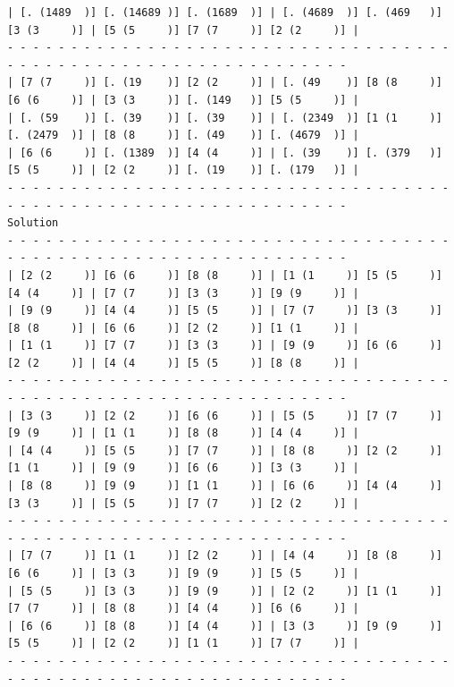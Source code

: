 \documentclass{article}
\begin{document}
\begin{small}
\begin{verbatim}
| [. (1489  )] [. (14689 )] [. (1689  )] | [. (4689  )] [. (469   )] [3 (3     )] | [5 (5     )] [7 (7     )] [2 (2     )] |
- - - - - - - - - - - - - - - - - - - - - - - - - - - - - - - - - - - - - - - - - - - - - - - - - - - - - - - - - - - - - -
| [7 (7     )] [. (19    )] [2 (2     )] | [. (49    )] [8 (8     )] [6 (6     )] | [3 (3     )] [. (149   )] [5 (5     )] |
| [. (59    )] [. (39    )] [. (39    )] | [. (2349  )] [1 (1     )] [. (2479  )] | [8 (8     )] [. (49    )] [. (4679  )] |
| [6 (6     )] [. (1389  )] [4 (4     )] | [. (39    )] [. (379   )] [5 (5     )] | [2 (2     )] [. (19    )] [. (179   )] |
- - - - - - - - - - - - - - - - - - - - - - - - - - - - - - - - - - - - - - - - - - - - - - - - - - - - - - - - - - - - - -
Solution
- - - - - - - - - - - - - - - - - - - - - - - - - - - - - - - - - - - - - - - - - - - - - - - - - - - - - - - - - - - - - -
| [2 (2     )] [6 (6     )] [8 (8     )] | [1 (1     )] [5 (5     )] [4 (4     )] | [7 (7     )] [3 (3     )] [9 (9     )] |
| [9 (9     )] [4 (4     )] [5 (5     )] | [7 (7     )] [3 (3     )] [8 (8     )] | [6 (6     )] [2 (2     )] [1 (1     )] |
| [1 (1     )] [7 (7     )] [3 (3     )] | [9 (9     )] [6 (6     )] [2 (2     )] | [4 (4     )] [5 (5     )] [8 (8     )] |
- - - - - - - - - - - - - - - - - - - - - - - - - - - - - - - - - - - - - - - - - - - - - - - - - - - - - - - - - - - - - -
| [3 (3     )] [2 (2     )] [6 (6     )] | [5 (5     )] [7 (7     )] [9 (9     )] | [1 (1     )] [8 (8     )] [4 (4     )] |
| [4 (4     )] [5 (5     )] [7 (7     )] | [8 (8     )] [2 (2     )] [1 (1     )] | [9 (9     )] [6 (6     )] [3 (3     )] |
| [8 (8     )] [9 (9     )] [1 (1     )] | [6 (6     )] [4 (4     )] [3 (3     )] | [5 (5     )] [7 (7     )] [2 (2     )] |
- - - - - - - - - - - - - - - - - - - - - - - - - - - - - - - - - - - - - - - - - - - - - - - - - - - - - - - - - - - - - -
| [7 (7     )] [1 (1     )] [2 (2     )] | [4 (4     )] [8 (8     )] [6 (6     )] | [3 (3     )] [9 (9     )] [5 (5     )] |
| [5 (5     )] [3 (3     )] [9 (9     )] | [2 (2     )] [1 (1     )] [7 (7     )] | [8 (8     )] [4 (4     )] [6 (6     )] |
| [6 (6     )] [8 (8     )] [4 (4     )] | [3 (3     )] [9 (9     )] [5 (5     )] | [2 (2     )] [1 (1     )] [7 (7     )] |
- - - - - - - - - - - - - - - - - - - - - - - - - - - - - - - - - - - - - - - - - - - - - - - - - - - - - - - - - - - - - -
\end{verbatim}
\end{small}
\end{document}
